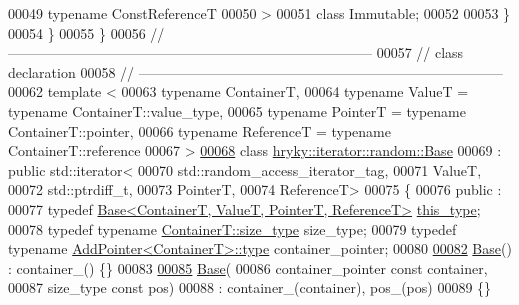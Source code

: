 \begin{DoxyCode}
00049         \textcolor{keyword}{typename} ConstReferenceT
00050         >
00051     \textcolor{keyword}{class }Immutable;
00052     
00053 \}
00054 \}
00055 \}
00056 \textcolor{comment}{//
      ------------------------------------------------------------------------------}
00057 \textcolor{comment}{// class declaration}
00058 \textcolor{comment}{//
      ------------------------------------------------------------------------------}
00062 \textcolor{comment}{}\textcolor{keyword}{template} <
00063     \textcolor{keyword}{typename} ContainerT, 
00064     \textcolor{keyword}{typename} ValueT = \textcolor{keyword}{typename} ContainerT::value\_type,
00065     \textcolor{keyword}{typename} PointerT = \textcolor{keyword}{typename} ContainerT::pointer,
00066     \textcolor{keyword}{typename} ReferenceT = \textcolor{keyword}{typename} ContainerT::reference
00067     >
\hypertarget{iterator__random_8h_source_l00068}{}\hyperlink{classhryky_1_1iterator_1_1random_1_1_base}{00068} \textcolor{keyword}{class }\hyperlink{classhryky_1_1iterator_1_1random_1_1_base}{hryky::iterator::random::Base}
00069     : \textcolor{keyword}{public} std::iterator<
00070         std::random\_access\_iterator\_tag,
00071         ValueT,
00072         std::ptrdiff\_t,
00073         PointerT,
00074         ReferenceT>
00075 \{
00076 \textcolor{keyword}{public} :
00077     \textcolor{keyword}{typedef} \hyperlink{classhryky_1_1iterator_1_1random_1_1_base}{Base<ContainerT, ValueT, PointerT, ReferenceT>} \hyperlink{classhryky_1_1iterator_1_1random_1_1_base}{this_type};
00078     \textcolor{keyword}{typedef} \textcolor{keyword}{typename} \hyperlink{namespacehryky_1_1display_a88ee3bfa154cce4c6715af0c3f53d062}{ContainerT::size_type} size\_type;
00079     \textcolor{keyword}{typedef} \textcolor{keyword}{typename} \hyperlink{classhryky_1_1_add_pointer}{AddPointer<ContainerT>::type} container\_pointer;
00080 
\hypertarget{iterator__random_8h_source_l00082}{}\hyperlink{classhryky_1_1iterator_1_1random_1_1_base_a81d186e541d1475dedaa204f1ae5d321}{00082}     \hyperlink{classhryky_1_1iterator_1_1random_1_1_base_a81d186e541d1475dedaa204f1ae5d321}{Base}() : container\_() \{\}
00083 
\hypertarget{iterator__random_8h_source_l00085}{}\hyperlink{classhryky_1_1iterator_1_1random_1_1_base_a0845b57755dfd114fbd1d9c658b415fa}{00085}     \hyperlink{classhryky_1_1iterator_1_1random_1_1_base_a81d186e541d1475dedaa204f1ae5d321}{Base}(
00086         container\_pointer \textcolor{keyword}{const} container,
00087         size\_type \textcolor{keyword}{const} pos)
00088         : container\_(container), pos\_(pos)
00089     \{\}

\end{DoxyCode}
